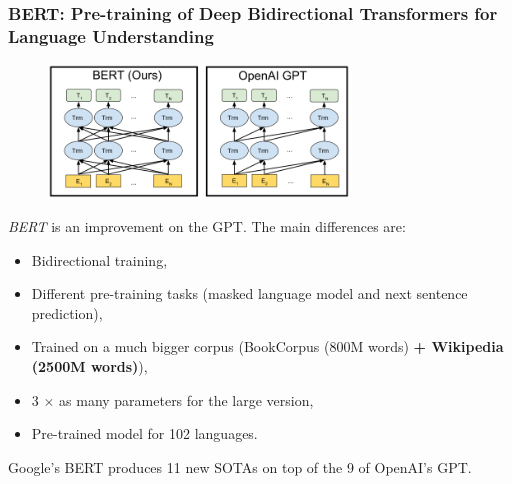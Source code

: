 \documentclass[9pt]{beamer}
\begin{document}

\begin{frame}
  \frametitle{BERT: Pre-training of Deep Bidirectional Transformers
    for Language Understanding}

  \begin{figure}
    \includegraphics[width = 8cm]{images/bert.png}
  \end{figure}

  \emph{BERT} is an improvement on the GPT. The main differences are:
  \begin{itemize}
  \item Bidirectional training,
  \item Different pre-training tasks (masked language model and next
    sentence prediction),
  \item Trained on a much bigger corpus (BookCorpus (800M words) \textbf{+
    Wikipedia (2500M words)}),
  \item 3 $\times$ as many parameters for the large version,
  \item Pre-trained model for 102 languages.
  \end{itemize}

  Google's BERT produces 11 new SOTAs on top of the 9 of OpenAI's GPT.
\end{frame}
\end{document}
